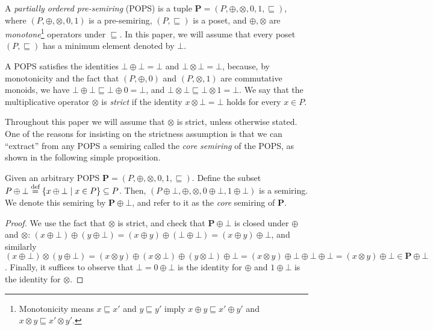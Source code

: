 \begin{defn}[POPS] \label{def:pops} A {\em partially ordered pre-semiring} (POPS) is a tuple
  $\bm P = (P, \oplus, \otimes, 0, 1, \sqsubseteq)$, where
  $(P, \oplus, \otimes, 0, 1)$ is a pre-semiring, $(P, \sqsubseteq)$
  is a poset, and $\oplus, \otimes$ are {\em monotone}\footnote{Monotonicity means
  $x\sqsubseteq x'$ and $y \sqsubseteq y'$ imply $x\oplus y \sqsubseteq x' \oplus y'$
  and $x \otimes y \sqsubseteq x' \otimes y'$.}
  operators under $\sqsubseteq$.
  In this paper, we will assume that every poset $(P, \sqsubseteq)$ has a minimum
  element denoted by $\bot$.
\end{defn}

A POPS satisfies the identities $\bot \oplus \bot = \bot$ and
$\bot \otimes \bot = \bot$, because, by monotonicity and the fact that
$(P,\oplus,0)$ and $(P,\otimes,1)$ are commutative monoids, we have
$\bot \oplus \bot \sqsubseteq \bot \oplus 0 = \bot$, and
$\bot \otimes \bot \sqsubseteq \bot \otimes 1 = \bot$.  We say that
the multiplicative operator $\otimes$ is {\em strict} if the identity
$x \otimes \bot = \bot$ holds for every $x \in P$.

Throughout this paper we will assume that $\otimes$ is strict,
unless otherwise stated.
One of the reasons for insisting on the strictness assumption is that
we can ``extract'' from any POPS a semiring called the {\em core semiring}
 of the POPS,
as shown in the following simple proposition.

\begin{prop} \label{prop:s:plus:bot} Given an arbitrary POPS
  $\bm P=(P,\oplus,\otimes,0,1,\sqsubseteq)$.  Define the subset
  $P\oplus \bot \stackrel{\text{def}}{=} \{{x\oplus\bot}\mid{x \in P}\} \subseteq P$.
  Then, $(P\oplus \bot, \oplus, \otimes, 0\oplus \bot, 1 \oplus \bot)$
  is a semiring.  We denote this semiring by $\bm P \oplus \bot$, and
  refer to it as the {\em core} semiring of $\bm P$.
\end{prop}
%
\begin{proof}
  We use the fact that $\otimes$ is strict, and check that
  $\bm P\oplus\bot$ is closed under $\oplus$ and $\otimes$:
  $(x\oplus\bot)\oplus(y\oplus\bot)=(x\oplus
  y)\oplus(\bot\oplus\bot)=(x\oplus y)\oplus\bot$, and similarly
  $(x\oplus\bot)\otimes(y\oplus\bot)=(x\otimes y)\oplus (x\otimes\bot)
  \oplus (y\otimes \bot) \oplus\bot = (x\otimes
  y)\oplus\bot\oplus\bot\oplus\bot=(x\otimes y)\oplus\bot \in \bm P
  \oplus \bot$.  Finally, it suffices to observe that $\bot= 0\oplus\bot$ is the identity
  for $\oplus$ and $1\oplus\bot$ is the identity for $\otimes$.
\end{proof}

